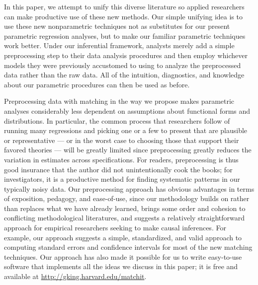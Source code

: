\documentclass[11pt,titlepage]{article}
\begin{document}
In this paper, we attempt to unify this diverse literature so applied
researchers can make productive use of these new methods.  Our simple
unifying idea is to use these new nonparametric techniques not as
substitutes for our present parametric regression analyses, but to
make our familiar parametric techniques work better.  Under our
inferential framework, analysts merely add a simple preprocessing step
to their data analysis procedures and then employ whichever models
they were previously accustomed to using to analyze the preprocessed
data rather than the raw data.  All of the intuition, diagnostics, and
knowledge about our parametric procedures can then be used as before.

Preprocessing data with matching in the way we propose makes
parametric analyses considerably less dependent on assumptions about
functional forms and distributions.  In particular, the common process
that researchers follow of running many regressions and picking one or
a few to present that are plausible or representative --- or in the
worst case to choosing those that support their favored theories ---
will be greatly limited since preprocessing greatly reduces the
variation in estimates across specifications.  For readers,
preprocessing is thus good insurance that the author did not
unintentionally cook the books; for investigators, it is a productive
method for finding systematic patterns in our typically noisy data.
Our preprocessing approach has obvious advantages in terms of
exposition, pedagogy, and ease-of-use, since our methodology builds on
rather than replaces what we have already learned, brings some order
and cohesion to conflicting methodological literatures, and suggests a
relatively straightforward approach for empirical researchers seeking
to make causal inferences.  For example, our approach suggests a
simple, standardized, and valid approach to computing standard errors
and confidence intervals for most of the new matching techniques.  Our
approach has also made it possible for us to write easy-to-use
software that implements all the ideas we discuss in this paper; it is
free and available at \url{http://gking.harvard.edu/matchit}.
\end{document}
